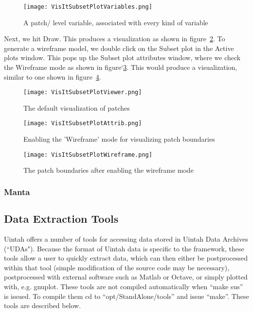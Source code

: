 \begin{figure}
  \center
  \texttt{[image: VisItSubsetPlotVariables.png]}
  \caption{A patch/ level variable, associated with every kind of variable}
  \label{VisItSubsetPlotVariables}
\end{figure}

Next, we hit Draw. This produces a visualization as shown in figure~\ref{VisItSubsetPlotViewer}. To generate a wireframe model, we double click on the Subset plot in the Active plots window. This pops up the Subset plot attributes window, where we check the Wireframe mode as shown in figure`\ref{VisItSubsetPlotAttrib}. This would produce a visualization, similar to one shown in figure~\ref{VisItSubsetPlotWireframe}.

\begin{figure}
  \center
  \texttt{[image: VisItSubsetPlotViewer.png]}
  \caption{The default visualization of patches} 
  \label{VisItSubsetPlotViewer}
\end{figure}

\begin{figure}
  \center
  \texttt{[image: VisItSubsetPlotAttrib.png]}
  \caption{Enabling the 'Wireframe' mode for visualizing patch boundaries}
  \label{VisItSubsetPlotAttrib}
\end{figure}

\begin{figure}
  \center
  \texttt{[image: VisItSubsetPlotWireframe.png]}
  \caption{The patch boundaries after enabling the wireframe mode}
  \label{VisItSubsetPlotWireframe}
\end{figure}

\subsubsection{Manta}

\subsection{Data Extraction Tools}

Uintah offers a number of tools for accessing data stored in Uintah Data
Archives (``UDAs").  Because the format of Uintah data is specific to the
framework, these tools allow a user to quickly extract data, which can then
either be postprocessed within that tool (simple modification of the source
code may be necessary), postprocessed with external software such as
Matlab or Octave, or simply plotted with, e.g. gnuplot.  These tools are not compiled automatically when ``make sus'' is issued.  To compile them cd to ``opt/StandAlone/tools'' and issue ``make''.  These tools
are described below.

